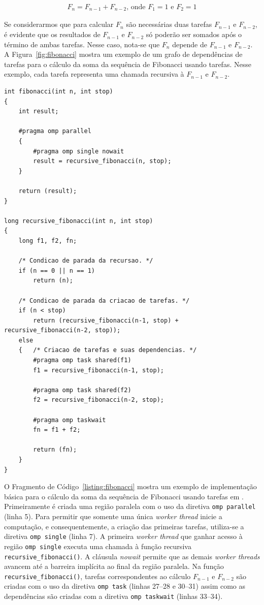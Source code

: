 \documentclass{SBCbookchapter}
\begin{document}
	\begin{align*}
		F_n = F_{n-1} + F_{n-2} \text{, onde } F_1=1 \text{ e } F_2=1
	\end{align*}

	Se considerarmos que para calcular $F_n$ são necessárias duas
	tarefas $F_{n-1}$ e $F_{n-2}$, é evidente que os resultados de
	$F_{n-1}$ e $F_{n-2}$ só poderão ser somados após o término de ambas
	tarefas. Nesse caso, nota-se que $F_n$ depende de $F_{n-1}$ e
	$F_{n-2}$. A Figura~\ref{fig:fibonacci} mostra um exemplo de um
	grafo de dependências de tarefas para o cálculo da soma da sequência
	de Fibonacci usando tarefas. Nesse exemplo, cada tarefa representa
	uma chamada recursiva à $F_{n-1}$ e $F_{n-2}$.

\begin{lstlisting}[float,floatplacement=b,frame=single, caption=Exemplo de uma implementação recursiva simples da soma da sequencia de Fibonacci
usando tarefas., label=listing:fibonacci]
int fibonacci(int n, int stop)
{
	int result;
	
	#pragma omp parallel
  	{
		#pragma omp single nowait
		result = recursive_fibonacci(n, stop);
	}
		
	return (result);
}

long recursive_fibonacci(int n, int stop)
{
	long f1, f2, fn;

	/* Condicao de parada da recursao. */
	if (n == 0 || n == 1) 
		return (n);

	/* Condicao de parada da criacao de tarefas. */
	if (n < stop) 
		return (recursive_fibonacci(n-1, stop) + recursive_fibonacci(n-2, stop));
	else
	{	/* Criacao de tarefas e suas dependencias. */
		#pragma omp task shared(f1)
		f1 = recursive_fibonacci(n-1, stop);

		#pragma omp task shared(f2)
		f2 = recursive_fibonacci(n-2, stop);
		
		#pragma omp taskwait
		fn = f1 + f2;
			
		return (fn);
	}
}
\end{lstlisting}

	O Fragmento de Código~\ref{listing:fibonacci} mostra um exemplo de
	implementação básica para o cálculo da soma da sequência de
	Fibonacci usando tarefas em \openmp. Primeiramente é criada uma
	região paralela com o uso da diretiva \texttt{omp parallel} (linha
	5). Para permitir que somente uma única \textit{worker thread}
	inicie a computação, e consequentemente, a criação das primeiras
	tarefas, utiliza-se a diretiva \texttt{omp single} (linha 7). A
	primeira \textit{worker thread} que ganhar acesso à região
	\texttt{omp single} executa uma chamada à função recursiva
	\texttt{recursive\_fibonacci()}. A cláusula \textit{nowait} permite
	que as demais \textit{worker threads} avancem até a barreira
	implícita ao final da região paralela. Na função
	\texttt{recursive\_fibonacci()}, tarefas correspondentes ao cálculo
	$F_{n-1}$ e $F_{n-2}$ são criadas com o uso da diretiva \texttt{omp
	task} (linhas 27--28 e 30--31) assim como as dependências são
	criadas com a diretiva \texttt{omp taskwait} (linhas 33--34).
	
\end{document}
